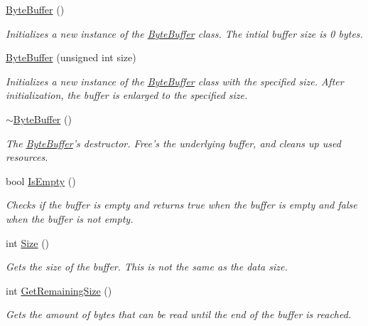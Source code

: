 \begin{DoxyCompactItemize}
\item 
\hyperlink{class_senergy_1_1_byte_buffer_ab3b85c02a2ee01df37673e8887df7956}{Byte\-Buffer} ()
\begin{DoxyCompactList}\small\item\em Initializes a new instance of the \hyperlink{class_senergy_1_1_byte_buffer}{Byte\-Buffer} class. The intial buffer size is 0 bytes. \end{DoxyCompactList}\item 
\hyperlink{class_senergy_1_1_byte_buffer_a95197b8b57bb0a752ad7650a59d5facd}{Byte\-Buffer} (unsigned int size)
\begin{DoxyCompactList}\small\item\em Initializes a new instance of the \hyperlink{class_senergy_1_1_byte_buffer}{Byte\-Buffer} class with the specified size. After initialization, the buffer is enlarged to the specified size. \end{DoxyCompactList}\item 
\hyperlink{class_senergy_1_1_byte_buffer_aef390f867878292a797065c21cec6afe}{$\sim$\-Byte\-Buffer} ()
\begin{DoxyCompactList}\small\item\em The \hyperlink{class_senergy_1_1_byte_buffer}{Byte\-Buffer}'s destructor. Free's the underlying buffer, and cleans up used resources. \end{DoxyCompactList}\item 
bool \hyperlink{class_senergy_1_1_byte_buffer_ad141d494b81ff561ede715c4f7ceb840}{Is\-Empty} ()
\begin{DoxyCompactList}\small\item\em Checks if the buffer is empty and returns true when the buffer is empty and false when the buffer is not empty. \end{DoxyCompactList}\item 
int \hyperlink{class_senergy_1_1_byte_buffer_a22be2d9d356958c4cf352bc31edb1735}{Size} ()
\begin{DoxyCompactList}\small\item\em Gets the size of the buffer. This is not the same as the data size. \end{DoxyCompactList}\item 
int \hyperlink{class_senergy_1_1_byte_buffer_ab938ed32f9f909145f93099f4620da69}{Get\-Remaining\-Size} ()
\begin{DoxyCompactList}\small\item\em Gets the amount of bytes that can be read until the end of the buffer is reached. \end{DoxyCompactList}\item 

\end{DoxyCompactItemize}
